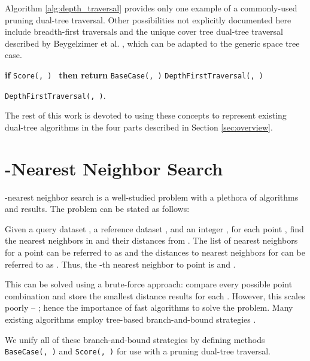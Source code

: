 \documentclass{article}
\begin{document}
Algorithm \ref{alg:depth_traversal} provides only one example of a commonly-used
pruning dual-tree traversal.  Other possibilities not explicitly documented here
include breadth-first traversals and the unique cover tree dual-tree traversal
described by Beygelzimer et al. , which can be adapted to
the generic space tree case.

\begin{algorithm}[tb]
\begin{algorithmic}
    \STATE \textbf{if} \texttt{Score(, ) } \textbf{then return}
    \medskip
    \FORALL{}
      \STATE \texttt{BaseCase(, )}
    \ENDFOR
    \medskip
    \FORALL{}
      \STATE \texttt{DepthFirstTraversal(,
)}
    \ENDFOR
  \end{algorithmic}

  \caption{\texttt{DepthFirstTraversal(, )}.}
  \label{alg:depth_traversal}
\end{algorithm}

The rest of this work is devoted to using these concepts to represent existing
dual-tree algorithms in the four parts described in Section \ref{sec:overview}.



\section{-Nearest Neighbor Search}
\label{sec:knn}


-nearest neighbor search is a well-studied problem with a plethora of
algorithms and results.  The problem can be stated as follows:

Given a query dataset , a reference dataset , and an integer , for each point ,
find the  nearest neighbors in  and their distances from .  The
list of nearest neighbors for a point  can be referred to as  and
the distances to nearest neighbors for  can be referred to as .
Thus, the -th nearest neighbor to point  is  and .

This can be solved using a brute-force approach: compare every possible point
combination and store the  smallest distance results for each .
However, this scales poorly -- ; hence the importance of fast algorithms
to solve the problem.  Many existing algorithms employ tree-based
branch-and-bound strategies \cite{langford2006, cover1967, friedman1977,
fukunaga1975, nbody, ram2009}.

We unify all of these branch-and-bound strategies by defining methods
\texttt{BaseCase(, )} and \texttt{Score(,
)} for use with a pruning dual-tree traversal.
\end{document}

